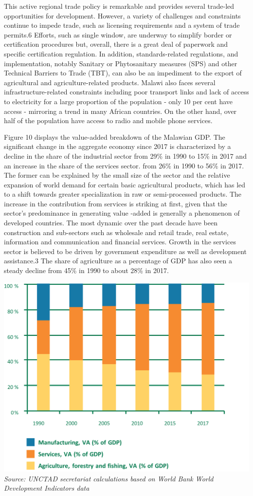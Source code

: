 \documentclass[
]{book}
\begin{document}
This active regional trade policy is remarkable and provides several trade-led opportunities for development. However, a variety of challenges and constraints continue to impede trade, such as licensing requirements and a system of trade permits.6 Efforts, such as single window, are underway to simplify border or certification procedures but, overall, there is a great deal of paperwork and specific certification regulation. In addition, standards-related regulations, and implementation, notably Sanitary or Phytosanitary measures (SPS) and other Technical Barriers to Trade (TBT), can also be an impediment to the export of agricultural and agriculture-related products. Malawi also faces several infrastructure-related constraints including poor transport links and lack of access to electricity for a large proportion of the population - only 10 per cent have access - mirroring a trend in many African countries. On the other hand, over half of the population have access to radio and mobile phone services.

Figure 10 displays the value-added breakdown of the Malawian GDP. The significant change in the aggregate economy since 2017 is characterized by a decline in the share of the industrial sector from 29\% in 1990 to 15\% in 2017 and an increase in the share of the services sector. from 26\% in 1990 to 56\% in 2017. The former can be explained by the small size of the sector and the relative expansion of world demand for certain basic agricultural products, which has led to a shift towards greater specialization in raw or semi-processed products. The increase in the contribution from services is striking at first, given that the sector's predominance in generating value -added is generally a phenomenon of developed countries. The most dynamic over the past decade have been construction and sub-sectors such as wholesale and retail trade, real estate, information and communication and financial services. Growth in the services sector is believed to be driven by government expenditure as well as development assistance.3 The share of agriculture as a percentage of GDP has also seen a steady decline from 45\% in 1990 to about 28\% in 2017.

\includegraphics{images/GDP_2017.png}
\emph{Source: UNCTAD secretariat calculations based on World Bank World Development Indicators data}
\end{document}
